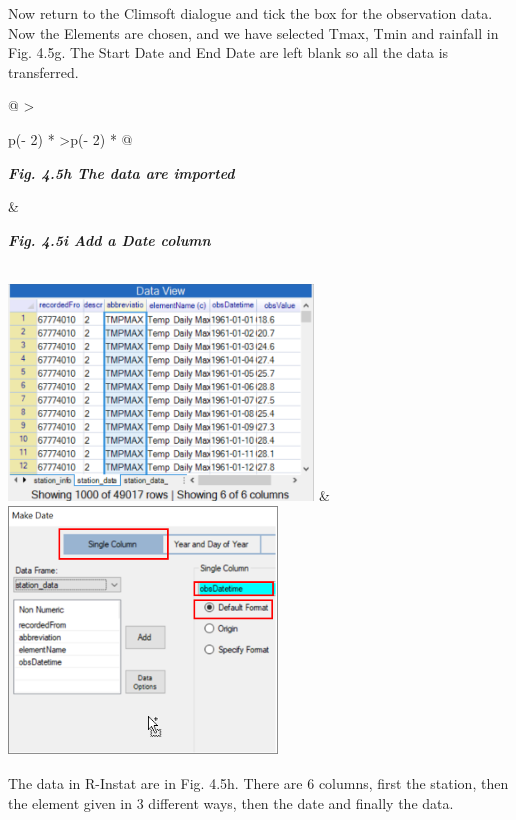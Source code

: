 \documentclass[
  letterpaper,
  DIV=11,
  numbers=noendperiod]{scrreprt}
\begin{document}
Now return to the Climsoft dialogue and tick the box for the observation
data. Now the Elements are chosen, and we have selected Tmax, Tmin and
rainfall in Fig. 4.5g. The Start Date and End Date are left blank so all
the data is transferred.

\begin{longtable}[]{@{}
  >{\raggedright\arraybackslash}p{(\columnwidth - 2\tabcolsep) * }
  >{\raggedleft\arraybackslash}p{(\columnwidth - 2\tabcolsep) * }@{}}
\toprule\noalign{}
\begin{minipage}[b]{\linewidth}\raggedright
\textbf{\emph{Fig. 4.5h The data are imported}}
\end{minipage} & \begin{minipage}[b]{\linewidth}\raggedleft
\textbf{\emph{Fig. 4.5i Add a Date column}}
\end{minipage} \\
\midrule\noalign{}
\endhead
\bottomrule\noalign{}
\endlastfoot
\includegraphics[width=3.1909in,height=2.25732in]{figures/Fig4.5h.png} &
\includegraphics[width=2.80877in,height=2.60524in]{figures/Fig4.5i.png} \\
\end{longtable}

The data in R-Instat are in Fig. 4.5h. There are 6 columns, first the
station, then the element given in 3 different ways, then the date and
finally the data.
\end{document}
